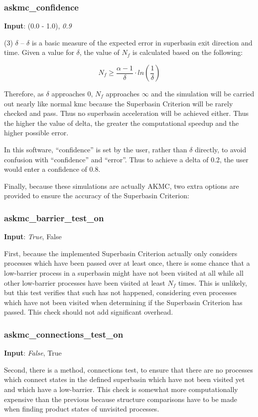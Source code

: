 \documentclass{article}
\begin{document}
\subsubsection{askmc\_confidence}

\noindent\textbf{Input}:  (0.0 - 1.0), \emph{0.9}

(3) $\delta$ -- $\delta$ is a basic measure of the expected error in superbasin exit direction and time.  Given a value for $\delta$, the value of $N_f$ is calculated based on the following:

\begin{equation}
N_f \ge \frac{\alpha - 1}{\delta} \cdot ln(\frac{1}{\delta}) \nonumber
\end{equation}

Therefore, as $\delta$ approaches $0$, $N_f$ approaches $\infty$ and the simulation will be carried out nearly like normal kmc because the Superbasin Criterion will be rarely checked and pass.  Thus no superbasin acceleration will be achieved either.  Thus the higher the value of delta, the greater the computational speedup and the higher possible error.

In this software, ``confidence'' is set by the user, rather than $\delta$ directly, to avoid confusion with ``confidence'' and ``error''.  Thus to achieve a delta of 0.2, the user would enter a confidence of 0.8.

Finally, because these simulations are actually AKMC, two extra options are provided to ensure the accuracy of the Superbasin Criterion:

\subsubsection{askmc\_barrier\_test\_on}

\noindent\textbf{Input}:  \emph{True}, False

First, because the implemented Superbasin Criterion actually only considers processes which have been passed over at least once, there is some chance that a low-barrier process in a superbasin might have not been visited at all while all other low-barrier processes have been visited at least $N_f$ times.  This is unlikely, but this test verifies that such has not happened, considering even processes which have not been visited when determining if the Superbasin Criterion has passed.  This check should not add significant overhead.

\subsubsection{askmc\_connections\_test\_on}

\noindent\textbf{Input}:  \emph{False}, True

Second, there is a method, connections test, to ensure that there are no processes which connect states in the defined superbasin which have not been visited yet and which have a low-barrier.  This check is somewhat more computationally expensive than the previous because structure comparisons have to be made when finding product states of unvisited processes.
\end{document}
